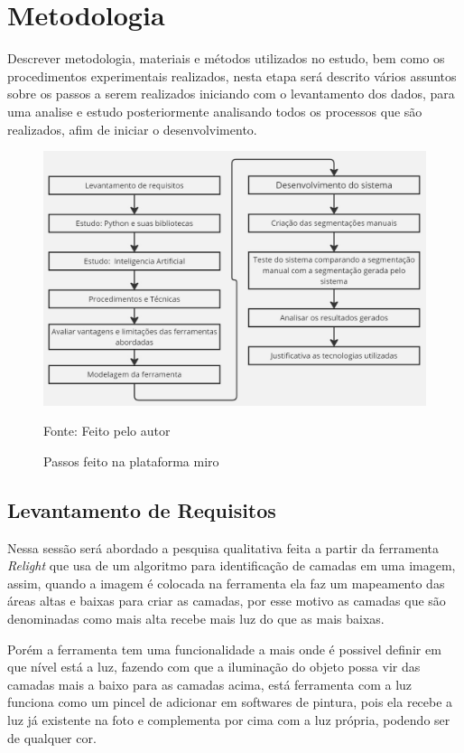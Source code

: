 \chapter{Metodologia}
\label{cap:03}

Descrever metodologia, materiais e métodos utilizados no estudo, bem como os procedimentos experimentais realizados, nesta etapa será descrito vários assuntos sobre os passos a serem realizados iniciando com o levantamento dos dados, para uma analise e estudo posteriormente analisando todos os processos que são realizados, afim de iniciar o desenvolvimento.


\begin{figure}[ht]
    \caption{Passos feito na plataforma miro}
    \centering
    \includegraphics[scale=0.4]{imagens/Diagrama.jpg}

    Fonte: Feito pelo autor
    \label{fig:diagrama}
\end{figure}

\section{Levantamento de Requisitos}

Nessa sessão será abordado a pesquisa qualitativa feita a partir da ferramenta \textit{Relight} que usa de um algoritmo para identificação de camadas em uma imagem, assim, quando a imagem é colocada na ferramenta ela faz um mapeamento das áreas altas e baixas para criar as camadas, por esse motivo as camadas que são denominadas como mais alta recebe mais luz do que as mais baixas.

Porém a ferramenta tem uma funcionalidade a mais onde é possivel definir em que nível está a luz, fazendo com que a iluminação do objeto possa vir das camadas mais a baixo para as camadas acima, está ferramenta com a luz funciona como um pincel de adicionar em softwares de pintura, pois ela recebe a luz já existente na foto e complementa por cima com a luz própria, podendo ser de qualquer cor.

